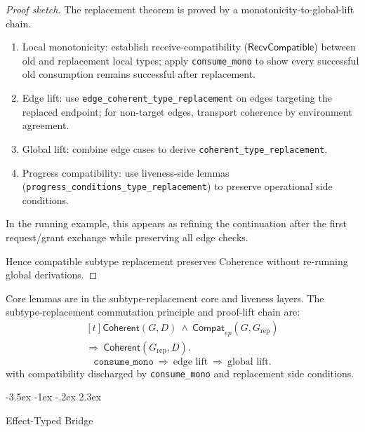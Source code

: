\documentclass[a4paper,10pt,twocolumn,english]{article}
\makeatletter
\renewcommand{\section}{\@startsection{section}{1}{\z@}%
  {-3.5ex \@plus -1ex \@minus -.2ex}%
  {2.3ex}%
  {\raggedright\normalfont\large\bfseries}}
\numberwithin{equation}{section}
\theoremstyle{paperdef}
\theoremstyle{paperplain}
\theoremstyle{paperdef}
\theoremstyle{paperremark}
\newcommand{\Coherent}{\ensuremath{\mathsf{Coherent}}}
\newcommand{\RecvCompatible}{\ensuremath{\mathsf{RecvCompatible}}}
\makeatother
\begin{document}
\begin{proof}[Proof sketch]
	The replacement theorem is proved by a monotonicity-to-global-lift chain.

	\begin{enumerate}
		\item Local monotonicity: establish receive-compatibility ($\RecvCompatible$) between old and replacement local types; apply \nolinkurl{consume_mono} to show every successful old consumption remains successful after replacement.
		\item Edge lift: use \nolinkurl{edge_coherent_type_replacement} on edges targeting the replaced endpoint; for non-target edges, transport coherence by environment agreement.
		\item Global lift: combine edge cases to derive \nolinkurl{coherent_type_replacement}.
		\item Progress compatibility: use liveness-side lemmas (\nolinkurl{progress_conditions_type_replacement}) to preserve operational side conditions.
	\end{enumerate}
	In the running example, this appears as refining the continuation after the
	first request/grant exchange while preserving all edge checks.

	Hence compatible subtype replacement preserves Coherence without re-running global derivations.
\end{proof}

Core lemmas are in the subtype-replacement core and liveness layers.
The subtype-replacement commutation principle and proof-lift chain are:
\begin{equation}
	\begin{aligned}[t]
		\Coherent(G,D)\ \land\ \mathsf{Compat}_{ep}(G,G_{\mathrm{rep}})
		\\
		\Longrightarrow\ \Coherent(G_{\mathrm{rep}},D).
	\end{aligned}
\end{equation}
\begin{equation}
	\texttt{consume\_mono}\ \Longrightarrow\ \text{edge lift}\ \Longrightarrow\ \text{global lift}.
\end{equation}
with compatibility discharged by \nolinkurl{consume_mono} and replacement side conditions.

\section{Effect-Typed Bridge}
\label{sec:bridge}
\end{document}
